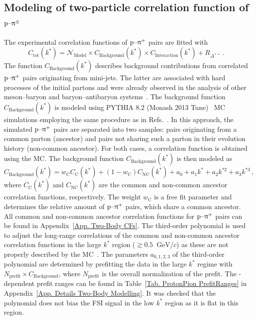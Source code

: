 \documentclass[ALICE,manyauthors]{cernphprep}
\begin{document}
\subsection{Modeling of two-particle correlation function of \texorpdfstring{$\mathbf{\text{p--}\uppi^\pm}$}{proton--pion}}
\label{Sec. Two-Body Modeling}
The experimental correlation functions of $\text{p--}\uppi^+$ pairs are fitted with
\begin{equation}
C_\text{tot}(k^*) = \mathcal{N}_\text{Model} \times  C_\text{Background}(k^*) \times C_\text{Interaction}(k^*) + R_{\Delta^{++}} \,. \label{Eq. ProtonPion Exp Fit}
\end{equation}
 The function $C_\text{Background}(k^*)$ describes background contributions from correlated $\text{p--}\uppi^+$ pairs originating from mini-jets. The latter are associated with hard processes of the initial partons and were already observed in the analysis of other meson--baryon and baryon--antibaryon systems~\cite{ALICE:2019gcn, ALICE:2021cpv, ALICE:2021cyj, ALICE:2023wjz}. The background function $C_\text{Background}(k^*)$ is modeled using  PYTHIA 8.2 (Monash 2013 Tune)~\cite{Sjostrand:2014zea, Skands:2014pea} MC simulations employing the same procedure as in Refs.~\cite{ALICE:2021cyj, ALICE:2023wjz}. In this approach, the simulated $\text{p--}\uppi^+$ pairs are separated into two samples: pairs originating from a common parton (ancestor) and pairs not sharing such a parton in their evolution history (non-common ancestor). For both cases, a correlation function is obtained using the MC. The background function $C_\text{Background}(k^*)$ is then modeled as
 \begin{equation}
     C_\text{Background}(k^*) = w_\text{C} C_\text{C}(k^*) + (1-w_\text{C}) C_\text{NC}(k^*) + a_0 + a_1k^* + a_2k^{*2} + a_3k^{*3}\,, \label{Eq. ProtonPion Background}
 \end{equation}
 where $C_\text{C}(k^*)$ and $C_\text{NC}(k^*)$ are the common and non-common ancestor correlation functions, respectively. The weight $w_\text{C}$ is a free fit parameter and determines the relative amount of $\text{p--}\uppi^+$ pairs, which share a common ancestor. All common and non-common ancestor correlation functions for $\text{p--}\uppi^+$ pairs can be found in Appendix~\ref{App. Two-Body CFs}. The third-order polynomial is used to adjust the long-range correlations of the common and non-common ancestor correlation functions in the large $k^*$ region ($\gtrsim 0.5~\text{ GeV}/c$) as these are not properly described by the MC~\cite{ALICE:2021cyj, ALICE:2023wjz}. The parameters $a_{0,1,2,3}$ of the third-order polynomial are determined by prefitting the data in the large $k^*$ regime with $N_\text{prefit}\times C_\text{Background}$, where $N_\text{prefit}$ is the overall normalization of the prefit. The \mtText-dependent prefit ranges can be found in Table~\ref{Tab. ProtonPion PrefitRanges} in Appendix~\ref{App. Details Two-Body Modelling}. It was checked that the polynomial does not bias the FSI signal in the low $k^*$ region as it is flat in this region.
\end{document}
